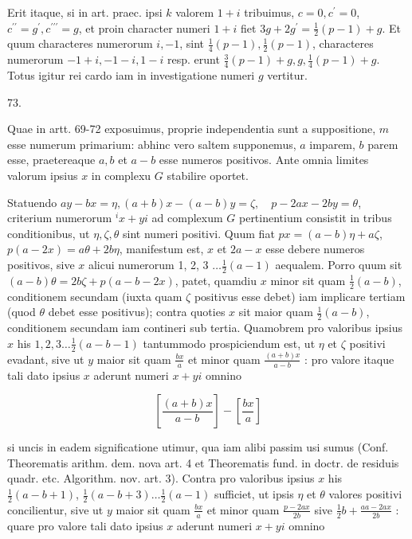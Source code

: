 \documentclass[10pt]{article}
\begin{document}
Erit itaque, si in art. praec. ipsi \(k\) valorem \(1+i\) tribuimus, \(c=0, c^{\prime}=0\), \(c^{\prime \prime}=g^{\prime}, c^{\prime \prime \prime}=g\), et proin character numeri \(1+i\) fiet \(3 g+2 g^{\prime}=\frac{1}{2}(p-1)+g\). Et quum characteres numerorum \(i,-1\), sint \(\frac{1}{4}(p-1), \frac{1}{2}(p-1)\), characteres numerorum \(-1+i,-1-i, 1-i\) resp. erunt \(\frac{3}{4}(p-1)+g, g, \frac{1}{4}(p-1)+g\). Totus igitur rei cardo iam in investigatione numeri \(g\) vertitur.

73.

Quae in artt. 69-72 exposuimus, proprie independentia sunt a suppositione, \(m\) esse numerum primarium: abhinc vero saltem supponemus, \(a\) imparem, \(b\) parem esse, praetereaque \(a, b\) et \(a-b\) esse numeros positivos. Ante omnia limites valorum ipsius \(x\) in complexu \(G\) stabilire oportet.

Statuendo \(a y-b x=\eta,(a+b) x-(a-b) y=\zeta, \quad p-2 a x-2 b y=\theta\), criterium numerorum \({ }^{i} x+y i\) ad complexum \(G\) pertinentium consistit in tribus conditionibus, ut \(\eta, \zeta, \theta\) sint numeri positivi. Quum fiat \(p x=(a-b) \eta+a \zeta\), \(p(a-2 x)=a \theta+2 b \eta\), manifestum est, \(x\) et \(2 a-x\) esse debere numeros positivos, sive \(x\) alicui numerorum 1, 2, 3 \(\ldots \frac{1}{2}(a-1)\) aequalem. Porro quum sit \((a-b) \theta=2 b \zeta+p(a-b-2 x)\), patet, quamdiu \(x\) minor sit quam \(\frac{1}{2}(a-b)\), conditionem secundam (iuxta quam \(\zeta\) positivus esse debet) iam implicare tertiam (quod \(\theta\) debet esse positivus); contra quoties \(x\) sit maior quam \(\frac{1}{2}(a-b)\), conditionem secundam iam contineri sub tertia. Quamobrem pro valoribus ipsius \(x\) his \(1,2,3 \ldots \frac{1}{2}(a-b-1)\) tantummodo prospiciendum est, ut \(\eta\) et \(\zeta\) positivi evadant, sive ut \(y\) maior sit quam \(\frac{b x}{a}\) et minor quam \(\frac{(a+b) x}{a-b}\) : pro valore itaque tali dato ipsius \(x\) aderunt numeri \(x+y i\) omnino

\[
\left[\frac{(a+b) x}{a-b}\right]-\left[\frac{b x}{a}\right]
\]

si uncis in eadem significatione utimur, qua iam alibi passim usi sumus (Conf. Theorematis arithm. dem. nova art. 4 et Theorematis fund. in doctr. de residuis quadr. etc. Algorithm. nov. art. 3). Contra pro valoribus ipsius \(x\) his \(\frac{1}{2}(a-b+1)\), \(\frac{1}{2}(a-b+3) \ldots \frac{1}{2}(a-1)\) sufficiet, ut ipsis \(\eta\) et \(\theta\) valores positivi concilientur, sive ut \(y\) maior sit quam \(\frac{b x}{a}\) et minor quam \(\frac{p-2 a x}{2 b}\) sive \(\frac{1}{2} b+\frac{a a-2 a x}{2 b}\) : quare pro valore tali dato ipsius \(x\) aderunt numeri \(x+y i\) omnino
\end{document}
